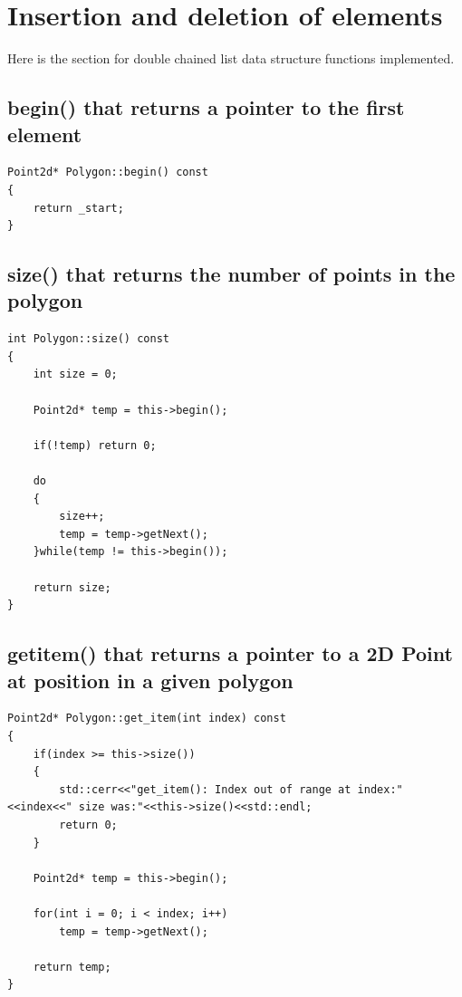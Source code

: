 \documentclass{article}
\begin{document}
\section{Insertion and deletion of elements}
Here is the section for double chained list data structure functions implemented.


		\subsection{begin() that returns a pointer to the first element}
		
\begin{lstlisting}[label=polygon-begin,caption=Polygon::begin() const]	
Point2d* Polygon::begin() const
{
    return _start;
}

\end{lstlisting}

		\subsection{size() that returns the number of points in the polygon}
		
\begin{lstlisting}[label=polygon-size,caption=Polygon::size() const]	
int Polygon::size() const
{
    int size = 0;

    Point2d* temp = this->begin();

    if(!temp) return 0;

    do
    {
        size++;
        temp = temp->getNext();
    }while(temp != this->begin());

    return size;
}

\end{lstlisting}

		\subsection{getitem() that returns a pointer to a 2D Point at position in a given polygon}
		
\begin{lstlisting}[label=polygon-getitem,caption=Polygon::getitem(int) const]	
Point2d* Polygon::get_item(int index) const
{
    if(index >= this->size())
    {
        std::cerr<<"get_item(): Index out of range at index:"<<index<<" size was:"<<this->size()<<std::endl;
        return 0;
    }

    Point2d* temp = this->begin();

    for(int i = 0; i < index; i++)
        temp = temp->getNext();

    return temp;
}

\end{lstlisting}
\end{document}
